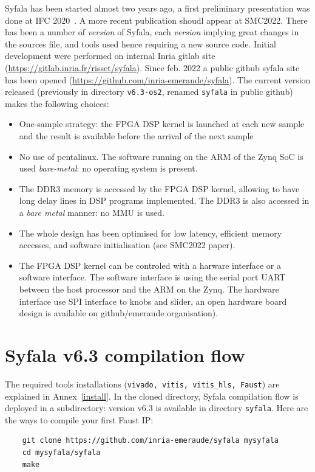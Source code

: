 \documentclass[11pt]{article}
\numberwithin{equation}{section}
\numberwithin{figure}{section}
\begin{document}
Syfala has been started almost two years ago, a first preliminary presentation was done at IFC 2020~\cite{Risset20}. A more recent publication shoudl appear at SMC2022. There has been a number of {\em version} of Syfala, each {\em version} implying great changes in the sources file, and tools used hence requiring a new source code. Initial development were performed on internal Inria gitlab site (\url{https://gitlab.inria.fr/risset/syfala}). Since feb. 2022 a public github syfala site has been opened (\url{https://github.com/inria-emeraude/syfala}). The current version released (previously in directory {\tt v6.3-os2}, renamed {\tt syfala} in public github) makes the following choices:
\begin{itemize}
\item One-sample strategy: the FPGA DSP kernel is launched at each new sample and the result is available before the arrival of the next sample
\item No use of pentalinux. The software running on the ARM of the Zynq SoC is used {\em bare-metal}: no operating system is present.
\item The DDR3 memory is accessed by the FPGA DSP kernel, allowing to have long delay lines in DSP programs implemented. The DDR3 is also accessed in a {\em bare metal} manner: no MMU is used.
\item The whole design has been optimised for low latency, efficient memory accesses, and software initialisation  (see SMC2022 paper).
\item The FPGA DSP kernel can be controled with a harware interface or a software interface. The software interface is using the serial port UART between the host processor and the ARM on the Zynq. The hardware interface use SPI interface to knobs and slider, an open hardware board design is available on github/emeraude organisation).
\end{itemize}
\newpage

\section{Syfala v6.3 compilation flow}
\label{syfala1}
The required tools installations ({\tt vivado, vitis, vitis\_hls, Faust}) are explained in Annex~\ref{install}. In the cloned directory, Syfala compilation flow is deployed in a subdirectory: version v6.3 is available in directory {\tt syfala}. Here are the ways to compile your first Faust IP: \\

\begin{boxedminipage}{\textwidth}
  \begin{verbatim}
    git clone https://github.com/inria-emeraude/syfala mysyfala
    cd mysyfala/syfala
    make
\end{verbatim}
\end{boxedminipage}
\end{document}
